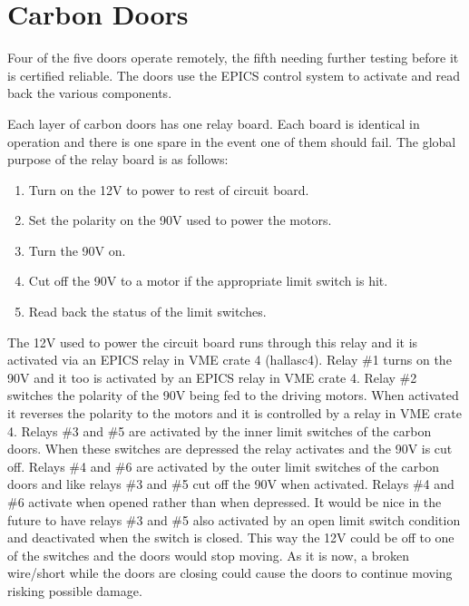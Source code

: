 {\section{Carbon Doors}


Four of the five doors operate remotely, the fifth needing further
testing before it is certified reliable. The
doors use the EPICS control system to activate and read back the
various components. 

Each layer of carbon doors has one relay board. 
Each board is identical in operation and
there is one spare in the event one of them should fail. The global
purpose of the relay board is as follows:

\begin{enumerate}
\item Turn on the 12V to power to rest of circuit board.

\item Set the polarity on the 90V used to power the motors.

\item Turn the 90V on.

\item Cut off the 90V to a motor if the appropriate limit switch is
hit.

\item Read back the status of the limit switches.
\end{enumerate}

The 12V used to power the circuit board runs through this relay and it is
activated via an EPICS relay in VME crate 4 (hallasc4). Relay \#1 turns
on the 90V and it too is activated by an EPICS  relay in VME crate 4.
Relay \#2 switches the polarity of the 90V being fed to the driving
motors. When activated it reverses the polarity to the motors and it is
controlled by a relay in VME crate 4. Relays \#3 and \#5 are activated by
the inner limit switches of the carbon doors. When these switches are
depressed the relay activates and the 90V is cut off. Relays \#4 and \#6
are activated by the outer limit switches of the carbon doors and like
relays \#3 and \#5 cut off the 90V when activated. Relays \#4 and
\#6 activate when opened rather than when depressed.
It would be nice in the
future to have relays \#3 and \#5 also activated by an open limit
switch condition and deactivated when the switch is closed. This way
the 12V could be off to one of the switches and the doors would stop
moving. As it is now, a broken wire/short while the doors are
closing could cause the doors to continue moving risking possible damage.


}

